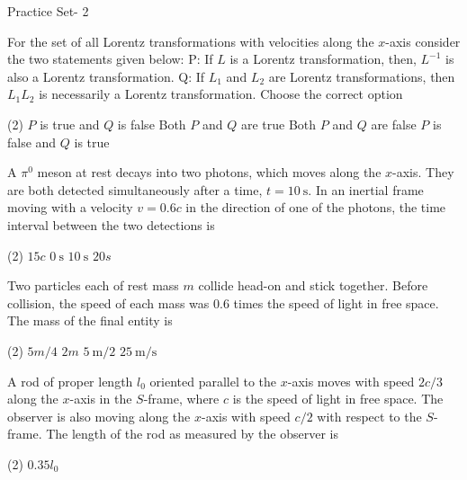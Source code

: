 \newpage
\begin{abox}
	Practice Set- 2
	\end{abox}
\begin{enumerate}
	\item For the set of all Lorentz transformations with velocities along the $x$-axis consider the two statements given below:
	P: If $L$ is a Lorentz transformation, then, $L^{-1}$ is also a Lorentz transformation.
	Q: If $L_{1}$ and $L_{2}$ are Lorentz transformations, then $L_{1} L_{2}$ is necessarily a Lorentz transformation.
	Choose the correct option
{	}
\begin{tasks}(2)
	\task[\textbf{A.}] $P$ is true and $Q$ is false
	\task[\textbf{B.}]Both $P$ and $Q$ are true
	\task[\textbf{C.}]Both $P$ and $Q$ are false
	\task[\textbf{D.}]$P$ is false and $Q$ is true
\end{tasks}
	\item A $\pi^{0}$ meson at rest decays into two photons, which moves along the $x$-axis. They are both detected simultaneously after a time, $t=10 \mathrm{~s} .$ In an inertial frame moving with a velocity $v=0.6 c$ in the direction of one of the photons, the time interval between the two detections is
	{}
\begin{tasks}(2)
	\task[\textbf{A.}] $15 c$
	\task[\textbf{B.}]$0 \mathrm{~s}$
	\task[\textbf{C.}] $10 \mathrm{~s}$
	\task[\textbf{D.}]$20 s$
\end{tasks}	
\begin{minipage}{\textwidth}
	\item Two particles each of rest mass $m$ collide head-on and stick together. Before collision, the speed of each mass was $0.6$ times the speed of light in free space. The mass of the final entity is
\end{minipage}
\begin{tasks}(2)
	\task[\textbf{A.}] $5 m / 4$
	\task[\textbf{B.}]$2 m$
	\task[\textbf{C.}]$5 \mathrm{~m} / 2$
	\task[\textbf{D.}]$25 \mathrm{~m} / \mathrm{s}$
\end{tasks}
	\item A rod of proper length $l_{0}$ oriented parallel to the $x$-axis moves with speed $2 c / 3$ along the $x$-axis in the $S$-frame, where $c$ is the speed of light in free space. The observer is also moving along the $x$-axis with speed $c / 2$ with respect to the $S$-frame. The length of the rod as measured by the observer is
	{}
\begin{tasks}(2)
	\task[\textbf{A.}] $0.35 l_{0}$

\end{tasks}
\end{enumerate}
